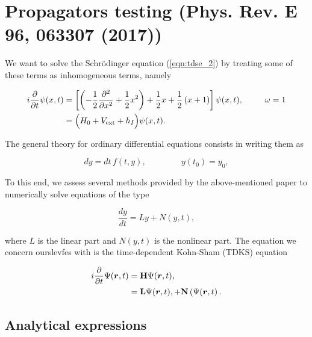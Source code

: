 

\newpage

\section{Propagators testing (Phys. Rev. E 96, 063307 (2017))}

We want to solve the Schr\"odinger equation (\ref{eqn:tdse_2}) 
by treating some of these terms as inhomogeneous terms, namely

\begin{align}
 i\frac{\partial}{\partial t}\psi(x,t) & = \left[
	\left(-\frac{1}{2}\frac{\partial^2}{\partial x^2} 
           + \frac{1}{2}x^2\right)
           + \frac{1}{2}x
           +\frac{1}{2}\left(x +1\right)\right]\psi(x,t),
	  \hspace{9mm} \omega=1 \label{eqn:inhomo_fake} \\
              & = \Big( H_0 +V_{\rm ext} + h_I\Big)\psi(x,t).
\end{align}

\noindent The general theory for ordinary differential equations
consists in writing them as

\begin{equation}
   dy = dt\,f(t,y), \hspace{50pt} y(t_0)=y_0,
   \label{eqn:gen_ode}
\end{equation}


To this end, we assess several methods provided by the above-mentioned 
paper to numerically solve equations of the type 

\begin{equation}
   \frac{dy}{dt} = Ly + N(y,t),
\end{equation}

\noindent where $L$ is the linear part and $N(y,t)$ is the nonlinear part.
The equation we concern ourslevfes with is the 
time-dependent Kohn-Sham (TDKS) equation

\begin{align}
   i\frac{\partial}{\partial t}{\boldsymbol \rm \Psi}(\boldsymbol{r},t) 
& = \boldsymbol{\rm H}{\boldsymbol \rm \Psi}(\boldsymbol{r},t), 
\label{eqn:tdks} \\
& = \boldsymbol{\rm L}{\boldsymbol \rm \Psi}(\boldsymbol{r},t),
   +  \boldsymbol{\rm N}\left({\boldsymbol \rm \Psi}(\boldsymbol{r},t\right).
    \label{eqn:tdks}
\end{align}

\subsection{Analytical expressions}
